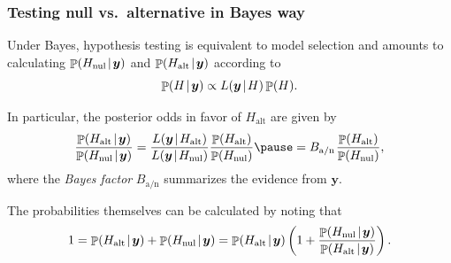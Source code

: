 \documentclass[18pt]{beamer}
\newcommand{\defineTightSpacing}{%
	\setlength{\abovedisplayskip}{.25\baselineskip}%
	\setlength{\belowdisplayskip}{.25\baselineskip}%
}
\newcommand{\given}{\mskip.7\thinmuskip | \mskip.7\thinmuskip}
\newcommand{\thinnerspace}{\mskip.5\thinmuskip}
\DeclareMathOperator{\probability}{\mathbb{P}}
\newcommand{\likelihood}{L}
\newcommand{\by}{\bm{y}}
\newcommand{\hypothesis}{H}
\newcommand{\nullSub}{\mathrm{nul}}
\newcommand{\altSub}{\mathrm{alt}}
\newcommand{\bayesFacAlt}{B_{\mathrm{a} / \mathrm{n}}}
\begin{document}
\begin{frame}
\frametitle{Testing null vs.\ alternative in Bayes way}
Under Bayes, hypothesis testing is equivalent to model selection and amounts to calculating $\probability(\hypothesis_\nullSub \given \by)$ and $\probability(\hypothesis_\altSub \given \by)$ according to
\begin{equation*} \defineTightSpacing%
\probability(\hypothesis \given \by)
	\propto \likelihood(\by \given \hypothesis) \probability(\hypothesis).
\end{equation*}

\pause
In particular, the posterior odds in favor of $\hypothesis_\altSub$ are given by
\begin{equation*} \defineTightSpacing%
\frac{%
	\probability(\hypothesis_\altSub \given \by)%
}{%
	\probability(\hypothesis_\nullSub \given \by)
}%
	= \frac{%
		\likelihood(\by \given \hypothesis_\altSub)%
	}{%
		\likelihood(\by \given \hypothesis_\nullSub) 
	}%
	\frac{%
		\probability(\hypothesis_\altSub)%
	}{%
		\probability(\hypothesis_\nullSub) 
	}
	\pause
	= \bayesFacAlt \thinnerspace
	\frac{%
		\probability(\hypothesis_\altSub)%
	}{%
		\probability(\hypothesis_\nullSub) 
	},
\end{equation*}
where the \textit{Bayes factor} $\bayesFacAlt$ summarizes the evidence from $\by$.

\pause
\smallskip
The probabilities themselves can be calculated by noting that 
\begin{equation*} \defineTightSpacing%
1 
	= \probability(\hypothesis_\altSub \given \by) + \probability(\hypothesis_\nullSub \given \by)
	= \probability(\hypothesis_\altSub \given \by) \left(
		1 + \frac{%
			\probability(\hypothesis_\nullSub \given \by)%
		}{%
			\probability(\hypothesis_\altSub \given \by) 
		}
	\right).
\end{equation*}
\end{frame}
\end{document}
